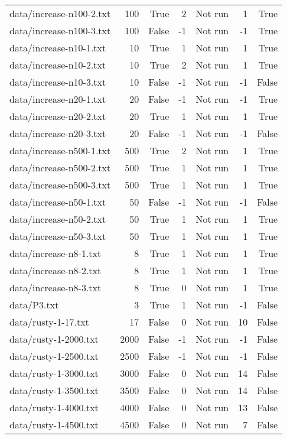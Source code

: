 \begin{tabular}{lrrrrrr}
data/increase-n100-2.txt & 100 & True & 2 & Not run & 1 & True \\
data/increase-n100-3.txt & 100 & False & -1 & Not run & -1 & True \\
data/increase-n10-1.txt & 10 & True & 1 & Not run & 1 & True \\
data/increase-n10-2.txt & 10 & True & 2 & Not run & 1 & True \\
data/increase-n10-3.txt & 10 & False & -1 & Not run & -1 & False \\
data/increase-n20-1.txt & 20 & False & -1 & Not run & -1 & True \\
data/increase-n20-2.txt & 20 & True & 1 & Not run & 1 & True \\
data/increase-n20-3.txt & 20 & False & -1 & Not run & -1 & False \\
data/increase-n500-1.txt & 500 & True & 2 & Not run & 1 & True \\
data/increase-n500-2.txt & 500 & True & 1 & Not run & 1 & True \\
data/increase-n500-3.txt & 500 & True & 1 & Not run & 1 & True \\
data/increase-n50-1.txt & 50 & False & -1 & Not run & -1 & False \\
data/increase-n50-2.txt & 50 & True & 1 & Not run & 1 & True \\
data/increase-n50-3.txt & 50 & True & 1 & Not run & 1 & True \\
data/increase-n8-1.txt & 8 & True & 1 & Not run & 1 & True \\
data/increase-n8-2.txt & 8 & True & 1 & Not run & 1 & True \\
data/increase-n8-3.txt & 8 & True & 0 & Not run & 1 & True \\
data/P3.txt & 3 & True & 1 & Not run & -1 & False \\
data/rusty-1-17.txt & 17 & False & 0 & Not run & 10 & False \\
data/rusty-1-2000.txt & 2000 & False & -1 & Not run & -1 & False \\
data/rusty-1-2500.txt & 2500 & False & -1 & Not run & -1 & False \\
data/rusty-1-3000.txt & 3000 & False & 0 & Not run & 14 & False \\
data/rusty-1-3500.txt & 3500 & False & 0 & Not run & 14 & False \\
data/rusty-1-4000.txt & 4000 & False & 0 & Not run & 13 & False \\
data/rusty-1-4500.txt & 4500 & False & 0 & Not run & 7 & False \\

\end{tabular}
